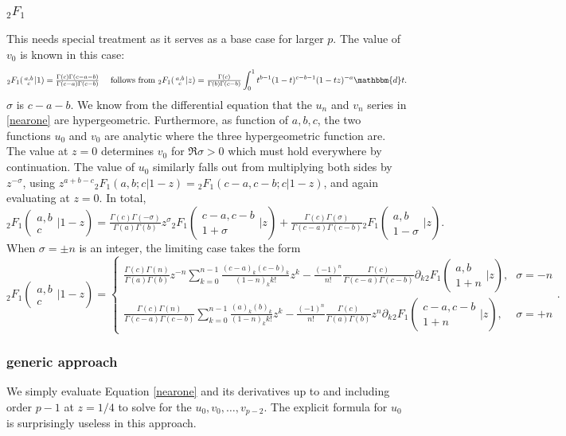 \documentclass[12pt]{article}
\newcommand{\dd}[0] {\mathbbm{d}}
\numberwithin{equation}{section}
\newcommand{\Head}[3] {{}_{#1}{#2}_{#3}}
\newcommand{\ArgS}[3] {( \begin{smallmatrix} #1 \\ #2 \end{smallmatrix} | {#3})}
\begin{document}
\subsubsection{$\Head{2}{F}{1}$}
This needs special treatment as it serves as a base case for larger $p$. The value of $v_0$ is known in this case:
\begin{equation*}
\Head{2}{F}{1} \ArgS{a,b}{c}{1} = \tfrac{\Gamma(c)\Gamma(c-a-b)}{\Gamma(c-a)\Gamma(c-b)} \quad \text{ follows from } \Head{2}{F}{1} \ArgS{a,b}{c}{z} = \tfrac{\Gamma(c)}{\Gamma(b)\Gamma(c-b)} \int_0^1 t^{b-1} (1-t)^{c-b-1} (1-t z)^{-a} \dd t\text{.}
\end{equation*}
$\sigma$ is $c-a-b$. We know from the differential equation that the $u_n$ and $v_n$ series in \eqref{nearone} are hypergeometric. Furthermore, as function of $a,b,c$, the two functions $u_0$ and $v_0$ are analytic where the three hypergeometric function are. The value at $z=0$ determines $v_0$ for $\Re \sigma > 0$ which must hold everywhere by continuation. The value of $u_0$ similarly falls out from multiplying both sides by $z^{-\sigma}$, using $z^{a+b-c} \Head{2}{F}{1}(a,b;c|1-z) = \Head{2}{F}{1}(c-a,c-b;c|1-z)$, and again evaluating at $z=0$. In total,
\begin{equation}
\label{equ_2F1_nearone}
\Head{2}{F}{1} \ArgS{a,b}{c}{1-z} = \tfrac{\Gamma(c)\Gamma(-\sigma)}{\Gamma(a)\Gamma(b)} z^{\sigma} \Head{2}{F}{1} \ArgS{c-a,c-b}{1+\sigma}{z} + \tfrac{\Gamma(c)\Gamma(\sigma)}{\Gamma(c-a)\Gamma(c-b)} \Head{2}{F}{1} \ArgS{a,b}{1-\sigma}{z}\text{.}
\end{equation}
When $\sigma=\pm n$ is an integer, the limiting case takes the form
\begin{equation*}
\Head{2}{F}{1} \ArgS{a,b}{c}{1-z} = \begin{cases} \tfrac{\Gamma(c)\Gamma(n)}{\Gamma(a)\Gamma(b)} z^{-n} \sum_{k=0}^{n-1} \tfrac{(c-a)_k(c-b)_k}{(1-n)_k k!} z^k - \tfrac{(-1)^{n}}{n!} \tfrac{\Gamma(c)}{\Gamma(c-a)\Gamma(c-b)} \partial_k \Head{2}{F}{1} \ArgS{a,b}{1+n}{z}\text{,} &\sigma = -n\\
\tfrac{\Gamma(c)\Gamma(n)}{\Gamma(c-a)\Gamma(c-b)} \sum_{k=0}^{n-1} \tfrac{(a)_k(b)_k}{(1-n)_k k!} z^k - \tfrac{(-1)^{n}}{n!} \tfrac{\Gamma(c)}{\Gamma(a)\Gamma(b)} z^n \partial_k \Head{2}{F}{1} \ArgS{c-a,c-b}{1+n}{z}\text{,} &\sigma = +n
\end{cases}
\text{.}
\end{equation*}

\subsubsection{generic approach}
We simply evaluate Equation \eqref{nearone} and its derivatives up to and including order $p-1$ at $z=1/4$ to solve for the $u_0,v_0,\dots,v_{p-2}$. The explicit formula for $u_0$ is surprisingly useless in this approach.
\end{document}

